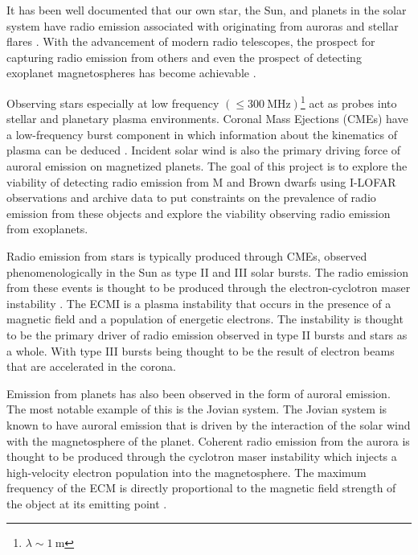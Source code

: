 It has been well documented that our own star, the Sun, and planets in the solar system have radio emission associated with originating from auroras and stellar flares \citep{murphy_lofar_2021, zarka_auroral_1998}. With the advancement of modern radio telescopes, the prospect for capturing radio emission from others and even the prospect of detecting exoplanet magnetospheres has become achievable \citep{vedantham_coherent_2020}. \

Observing stars especially at low frequency $(\leq 300 \ \text{MHz})$\footnote{$\lambda \sim 1 \ \text{m}$} act as probes into stellar and planetary plasma environments. Coronal Mass Ejections (CMEs) have a low-frequency burst component in which information about the kinematics of plasma can be deduced \citep{villadsen_ultra-wideband_2019}. Incident solar wind is also the primary driving force of auroral emission on magnetized planets. The goal of this project is to explore the viability of detecting radio emission from M and Brown dwarfs using I-LOFAR observations and archive data to put constraints on the prevalence of radio emission from these objects and explore the viability observing radio emission from exoplanets. \

Radio emission from stars is typically produced through CMEs, observed phenomenologically in the Sun as type II and III solar bursts. The radio emission from these events is thought to be produced through the electron-cyclotron maser instability \citep[ECMI;][]{EMI}. The ECMI is a plasma instability that occurs in the presence of a magnetic field and a population of energetic electrons. The instability is thought to be the primary driver of radio emission observed in type II bursts and stars as a whole. With type III bursts being thought to be the result of electron beams that are accelerated in the corona. \

Emission from planets has also been observed in the form of auroral emission. The most notable example of this is the Jovian system. The Jovian system is known to have auroral emission that is driven by the interaction of the solar wind with the magnetosphere of the planet. Coherent radio emission from the aurora is thought to be produced through the cyclotron maser instability \citep[ECM;][]{zarka_auroral_1998} which injects a high-velocity electron population into the magnetosphere. The maximum frequency of the ECM is directly proportional to the magnetic field strength of the object at its emitting point \citep{kavanagh_hunting_2023, joe_nature_review}.

